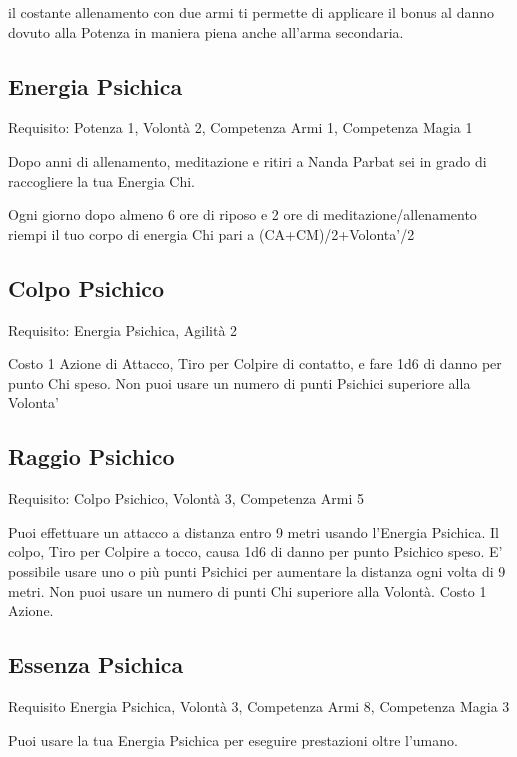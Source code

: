\documentclass[a4paper,11pt,twoside,openany]{book}
\begin{document}
il costante allenamento con due armi ti permette di applicare il bonus al danno dovuto alla Potenza in maniera piena anche all'arma secondaria.

\subsection{Energia Psichica}

Requisito: Potenza 1, Volontà 2, Competenza Armi 1, Competenza Magia 1

Dopo anni di allenamento, meditazione e ritiri a Nanda Parbat sei in grado di raccogliere la tua Energia Chi.

Ogni giorno dopo almeno 6 ore di riposo e 2 ore di meditazione/allenamento riempi il tuo corpo di energia Chi pari a (CA+CM)/2+Volonta'/2

\subsection{Colpo Psichico}

Requisito: Energia Psichica, Agilità 2

Costo 1 Azione di Attacco, Tiro per Colpire di contatto, e fare 1d6 di danno per punto Chi speso. Non puoi usare un numero di punti Psichici superiore alla Volonta'

\subsection{Raggio Psichico}

Requisito: Colpo Psichico, Volontà 3, Competenza Armi 5

Puoi effettuare un attacco a distanza entro 9 metri usando l'Energia Psichica.
Il colpo, Tiro per Colpire a tocco, causa 1d6 di danno per punto Psichico speso. E' possibile usare uno o più punti Psichici per aumentare la distanza ogni volta di 9 metri.
Non puoi usare un numero di punti Chi superiore alla Volontà. Costo 1 Azione.

\subsection{Essenza Psichica}

Requisito Energia Psichica, Volontà 3, Competenza Armi 8, Competenza Magia 3

Puoi usare la tua Energia Psichica per eseguire prestazioni oltre l'umano.
\end{document}
